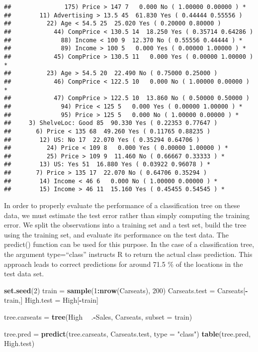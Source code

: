 \documentclass[]{article}
\newenvironment{Shaded}{\begin{snugshade}}{\end{snugshade}}
\newcommand{\KeywordTok}[1]{\textcolor[rgb]{0.13,0.29,0.53}{\textbf{#1}}}
\newcommand{\DataTypeTok}[1]{\textcolor[rgb]{0.13,0.29,0.53}{#1}}
\newcommand{\DecValTok}[1]{\textcolor[rgb]{0.00,0.00,0.81}{#1}}
\newcommand{\StringTok}[1]{\textcolor[rgb]{0.31,0.60,0.02}{#1}}
\newcommand{\OperatorTok}[1]{\textcolor[rgb]{0.81,0.36,0.00}{\textbf{#1}}}
\newcommand{\NormalTok}[1]{#1}
\begin{document}
\begin{verbatim}
##               175) Price > 147 7   0.000 No ( 1.00000 0.00000 ) *
##        11) Advertising > 13.5 45  61.830 Yes ( 0.44444 0.55556 )  
##          22) Age < 54.5 25  25.020 Yes ( 0.20000 0.80000 )  
##            44) CompPrice < 130.5 14  18.250 Yes ( 0.35714 0.64286 )  
##              88) Income < 100 9  12.370 No ( 0.55556 0.44444 ) *
##              89) Income > 100 5   0.000 Yes ( 0.00000 1.00000 ) *
##            45) CompPrice > 130.5 11   0.000 Yes ( 0.00000 1.00000 ) *
##          23) Age > 54.5 20  22.490 No ( 0.75000 0.25000 )  
##            46) CompPrice < 122.5 10   0.000 No ( 1.00000 0.00000 ) *
##            47) CompPrice > 122.5 10  13.860 No ( 0.50000 0.50000 )  
##              94) Price < 125 5   0.000 Yes ( 0.00000 1.00000 ) *
##              95) Price > 125 5   0.000 No ( 1.00000 0.00000 ) *
##     3) ShelveLoc: Good 85  90.330 Yes ( 0.22353 0.77647 )  
##       6) Price < 135 68  49.260 Yes ( 0.11765 0.88235 )  
##        12) US: No 17  22.070 Yes ( 0.35294 0.64706 )  
##          24) Price < 109 8   0.000 Yes ( 0.00000 1.00000 ) *
##          25) Price > 109 9  11.460 No ( 0.66667 0.33333 ) *
##        13) US: Yes 51  16.880 Yes ( 0.03922 0.96078 ) *
##       7) Price > 135 17  22.070 No ( 0.64706 0.35294 )  
##        14) Income < 46 6   0.000 No ( 1.00000 0.00000 ) *
##        15) Income > 46 11  15.160 Yes ( 0.45455 0.54545 ) *
\end{verbatim}

In order to properly evaluate the performance of a classification tree
on these data, we must estimate the test error rather than simply
computing the training error. We split the observations into a training
set and a test set, build the tree using the training set, and evaluate
its performance on the test data. The predict() function can be used for
this purpose. In the case of a classification tree, the argument
type=``class'' instructs R to return the actual class prediction. This
approach leads to correct predictions for around 71.5 \% of the
locations in the test data set.

\begin{Shaded}
\begin{Highlighting}[]
\KeywordTok{set.seed}\NormalTok{(}\DecValTok{2}\NormalTok{)}
\NormalTok{train =}\StringTok{ }\KeywordTok{sample}\NormalTok{(}\DecValTok{1}\OperatorTok{:}\KeywordTok{nrow}\NormalTok{(Carseats), }\DecValTok{200}\NormalTok{)}
\NormalTok{Carseats.test =}\StringTok{ }\NormalTok{Carseats[}\OperatorTok{-}\NormalTok{train,]}
\NormalTok{High.test =}\StringTok{ }\NormalTok{High[}\OperatorTok{-}\NormalTok{train]}

\NormalTok{tree.carseats =}\StringTok{ }\KeywordTok{tree}\NormalTok{(High }\OperatorTok{~}\StringTok{ }\NormalTok{.}\OperatorTok{-}\NormalTok{Sales, Carseats, }\DataTypeTok{subset =}\NormalTok{ train)}

\NormalTok{tree.pred =}\StringTok{ }\KeywordTok{predict}\NormalTok{(tree.carseats, Carseats.test, }\DataTypeTok{type =} \StringTok{"class"}\NormalTok{)}
\KeywordTok{table}\NormalTok{(tree.pred, High.test)}
\end{Highlighting}
\end{Shaded}
\end{document}
